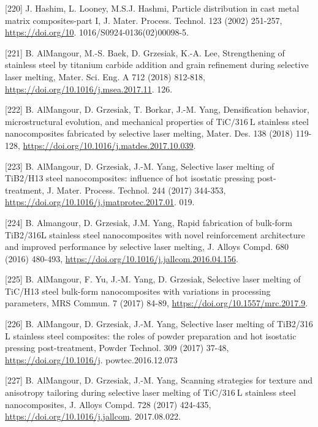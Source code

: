 \documentclass[10pt]{article}
\begin{document}
[220] J. Hashim, L. Looney, M.S.J. Hashmi, Particle distribution in cast metal matrix composites-part I, J. Mater. Process. Technol. 123 (2002) 251-257, \href{https://doi.org/10}{https://doi.org/10}. 1016/S0924-0136(02)00098-5.

[221] B. AlMangour, M.-S. Baek, D. Grzesiak, K.-A. Lee, Strengthening of stainless steel by titanium carbide addition and grain refinement during selective laser melting, Mater. Sci. Eng. A 712 (2018) 812-818, \href{https://doi.org/10.1016/j.msea.2017.11}{https://doi.org/10.1016/j.msea.2017.11}. 126.

[222] B. AlMangour, D. Grzesiak, T. Borkar, J.-M. Yang, Densification behavior, microstructural evolution, and mechanical properties of $\mathrm{TiC} / 316 \mathrm{~L}$ stainless steel nanocomposites fabricated by selective laser melting, Mater. Des. 138 (2018) 119-128, \href{https://doi.org/10.1016/j.matdes.2017.10.039}{https://doi.org/10.1016/j.matdes.2017.10.039}.

[223] B. AlMangour, D. Grzesiak, J.-M. Yang, Selective laser melting of TiB2/H13 steel nanocomposites: influence of hot isostatic pressing post-treatment, J. Mater. Process. Technol. 244 (2017) 344-353, \href{https://doi.org/10.1016/j.jmatprotec.2017.01}{https://doi.org/10.1016/j.jmatprotec.2017.01}. 019.

[224] B. Almangour, D. Grzesiak, J.M. Yang, Rapid fabrication of bulk-form TiB2/316L stainless steel nanocomposites with novel reinforcement architecture and improved performance by selective laser melting, J. Alloys Compd. 680 (2016) 480-493, \href{https://doi.org/10.1016/j.jallcom.2016.04.156}{https://doi.org/10.1016/j.jallcom.2016.04.156}.

[225] B. AlMangour, F. Yu, J.-M. Yang, D. Grzesiak, Selective laser melting of TiC/H13 steel bulk-form nanocomposites with variations in processing parameters, MRS Commun. 7 (2017) 84-89, \href{https://doi.org/10.1557/mrc.2017.9}{https://doi.org/10.1557/mrc.2017.9}.

[226] B. AlMangour, D. Grzesiak, J.-M. Yang, Selective laser melting of TiB2/316 L stainless steel composites: the roles of powder preparation and hot isostatic pressing post-treatment, Powder Technol. 309 (2017) 37-48, \href{https://doi.org/10.1016/j}{https://doi.org/10.1016/j}. powtec.2016.12.073

[227] B. AlMangour, D. Grzesiak, J.-M. Yang, Scanning strategies for texture and anisotropy tailoring during selective laser melting of $\mathrm{TiC} / 316 \mathrm{~L}$ stainless steel nanocomposites, J. Alloys Compd. 728 (2017) 424-435, \href{https://doi.org/10.1016/j.jallcom}{https://doi.org/10.1016/j.jallcom}. 2017.08.022.
\end{document}
